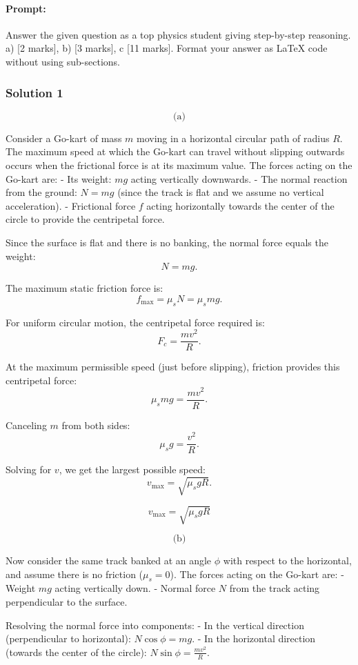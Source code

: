\documentclass{article}
\begin{document}
\paragraph{Prompt: \\} 
Answer the given question as a top physics student giving step-by-step reasoning. a) [2 marks], b) [3 marks], c [11 marks].
Format your answer as LaTeX code without using sub-sections. 

\subsubsection{Solution 1}
\[
\text{(a)}
\]

Consider a Go-kart of mass \(m\) moving in a horizontal circular path of radius \(R\). The maximum speed at which the Go-kart can travel without slipping outwards occurs when the frictional force is at its maximum value. The forces acting on the Go-kart are:
- Its weight: \(mg\) acting vertically downwards.
- The normal reaction from the ground: \(N = mg\) (since the track is flat and we assume no vertical acceleration).
- Frictional force \(f\) acting horizontally towards the center of the circle to provide the centripetal force.

Since the surface is flat and there is no banking, the normal force equals the weight:
\[
N = mg.
\]

The maximum static friction force is:
\[
f_{\max} = \mu_s N = \mu_s mg.
\]

For uniform circular motion, the centripetal force required is:
\[
F_c = \frac{mv^2}{R}.
\]

At the maximum permissible speed (just before slipping), friction provides this centripetal force:
\[
\mu_s mg = \frac{mv^2}{R}.
\]

Canceling \(m\) from both sides:
\[
\mu_s g = \frac{v^2}{R}.
\]

Solving for \(v\), we get the largest possible speed:
\[
v_{\max} = \sqrt{\mu_s g R}.
\]

\[
\boxed{v_{\max} = \sqrt{\mu_s g R}}
\]

\[
\text{(b)}
\]

Now consider the same track banked at an angle \(\phi\) with respect to the horizontal, and assume there is no friction (\(\mu_s = 0\)). The forces acting on the Go-kart are:
- Weight \(mg\) acting vertically down.
- Normal force \(N\) from the track acting perpendicular to the surface.

Resolving the normal force into components:
- In the vertical direction (perpendicular to horizontal): \(N \cos\phi = mg\).
- In the horizontal direction (towards the center of the circle): \(N \sin\phi = \frac{mv^2}{R}\).
\end{document}
